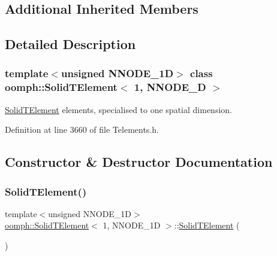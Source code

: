 \subsection*{Additional Inherited Members}


\subsection{Detailed Description}
\subsubsection*{template$<$unsigned N\+N\+O\+D\+E\+\_\+1D$>$\newline
class oomph\+::\+Solid\+T\+Element$<$ 1, N\+N\+O\+D\+E\+\_\+D $>$}

\hyperlink{classoomph_1_1SolidTElement}{Solid\+T\+Element} elements, specialised to one spatial dimension. 

Definition at line 3660 of file Telements.\+h.



\subsection{Constructor \& Destructor Documentation}
\mbox{\label{classoomph_1_1SolidTElement_3_011_00_01NNODE__1D_01_4_ae89f5eb35a83d760288e9ec596977e75}} 
\subsubsection{\texorpdfstring{Solid\+T\+Element()}{SolidTElement()}\hspace{0.1cm}{\footnotesize\ttfamily [1/2]}}
{\footnotesize\ttfamily template$<$unsigned N\+N\+O\+D\+E\+\_\+1D$>$ \\
\hyperlink{classoomph_1_1SolidTElement}{oomph\+::\+Solid\+T\+Element}$<$ 1, N\+N\+O\+D\+E\+\_\+1D $>$\+::\hyperlink{classoomph_1_1SolidTElement}{Solid\+T\+Element} (\begin{DoxyParamCaption}{ }\end{DoxyParamCaption})\hspace{0.3cm}{\ttfamily [inline]}}



